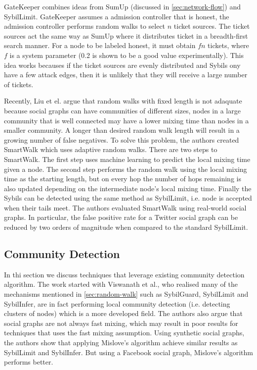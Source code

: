 GateKeeper\cite{tran2011optimal} combines ideas from SumUp (discussed in
\autoref{sec:network-flow}) and SybilLimit. GateKeeper assumes a admission
controller that is honest, the admission controller performs random walks to
select $n$ ticket sources. The ticket sources act the same way as SumUp where it
distributes ticket in a breadth-first search manner. For a node to be labeled
honest, it must obtain $fn$ tickets, where $f$ is a system parameter (0.2 is
shown to be a good value experimentally). This idea works becauses if the ticket
sources are evenly distributed and Sybils ony have a few attack edges, then it
is unlikely that they will receive a large number of tickets.

Recently, Liu et el. argue that random walks with fixed length is not adaquate
because social graphs can have communities of different sizes, nodes in a large
community that is well connected may have a lower mixing time than nodes in a
smaller community. A longer than desired random walk length will result in a
growing number of false negatives. To solve this problem, the authors created
SmartWalk\cite{liu2016smartwalk} which uses adaptive random walks. There are two
steps to SmartWalk. The first step uses machine learning to predict the local
mixing time given a node. The second step performs the random walk using the
local mixing time as the starting length, but on every hop the number of hops
remaining is also updated depending on the intermediate node's local mixing
time. Finally the Sybils can be detected using the same method as SybilLimit,
i.e. node is accepted when their tails meet. The authors evaluated SmartWalk
using real-world social graphs. In particular, the false positive rate for a
Twitter social graph can be reduced by two orders of magnitude when compared to
the standard SybilLimit.


\subsection{Community Detection}\label{sec:community-detection}
In thi section we discuss techniques that leverage existing community detection
algorithm. The work started with Viswanath et al., who realised many of the
mechanisms mentioned in \autoref{sec:random-walk} such as SybilGuard, SybilLimit
and SybilInfer, are in fact performing local community detection (i.e. detecting
clusters of nodes) which is a more developed field\cite{viswanath2010analysis}.
The authors also argue that social graphs are not always fast mixing, which may
result in poor results for techniques that uses the fast mixing assumption.
Using synthetic social graphs, the authors show that applying Mislove's
algorithm\cite{mislove2010you} achieve similar results as SybilLimit and
SybilInfer. But using a Facebook social graph, Mislove's algorithm performs
better.

